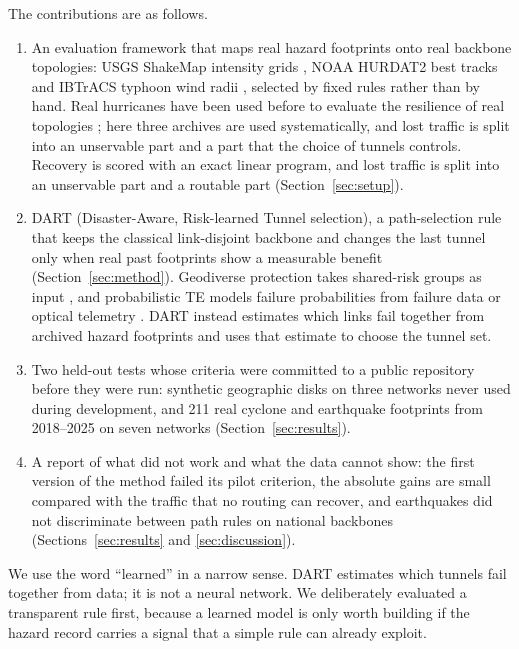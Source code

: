 \documentclass[preprint,12pt]{elsarticle}
\begin{document}
The contributions are as follows.
\begin{enumerate}
\item An evaluation framework that maps real hazard footprints onto real backbone topologies: USGS ShakeMap intensity grids \cite{trinet99}, NOAA HURDAT2 best tracks \cite{hurdat13} and IBTrACS typhoon wind radii \cite{ibtracs10}, selected by fixed rules rather than by hand. Real hurricanes have been used before to evaluate the resilience of real topologies \cite{alenazi23}; here three archives are used systematically, and lost traffic is split into an unservable part and a part that the choice of tunnels controls. Recovery is scored with an exact linear program, and lost traffic is split into an unservable part and a routable part (Section~\ref{sec:setup}).
\item DART (Disaster-Aware, Risk-learned Tunnel selection), a path-selection rule that keeps the classical link-disjoint backbone and changes the last tunnel only when real past footprints show a measurable benefit (Section~\ref{sec:method}). Geodiverse protection takes shared-risk groups as input \cite{giraosilva20}, and probabilistic TE models failure probabilities from failure data \cite{teavar19} or optical telemetry \cite{prete25}. DART instead estimates which links fail together from archived hazard footprints and uses that estimate to choose the tunnel set.
\item Two held-out tests whose criteria were committed to a public repository before they were run: synthetic geographic disks on three networks never used during development, and 211 real cyclone and earthquake footprints from 2018--2025 on seven networks (Section~\ref{sec:results}).
\item A report of what did not work and what the data cannot show: the first version of the method failed its pilot criterion, the absolute gains are small compared with the traffic that no routing can recover, and earthquakes did not discriminate between path rules on national backbones (Sections~\ref{sec:results} and \ref{sec:discussion}).
\end{enumerate}

We use the word ``learned'' in a narrow sense. DART estimates which tunnels fail together from data; it is not a neural network. We deliberately evaluated a transparent rule first, because a learned model is only worth building if the hazard record carries a signal that a simple rule can already exploit.

\end{document}
